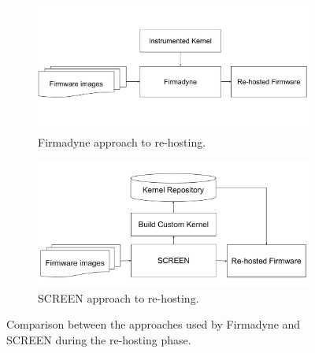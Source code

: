 \begin{figure}[h]
     \centering
     \begin{subfigure}[b]{0.45\textwidth}
         \centering
         \includegraphics[width=\textwidth]{figs/Firmadyne-Approach.pdf}
         \caption{Firmadyne approach to re-hosting.}
         \label{fig:firmadyne-approach}
     \end{subfigure}
     \hfill
     \begin{subfigure}[b]{0.45\textwidth}
         \centering
         \includegraphics[width=\textwidth]{figs/SCREEN-Approach.pdf}
         \caption{SCREEN approach to re-hosting.}
         \label{fig:screen-approach}
     \end{subfigure}
        \caption{Comparison between the approaches used by Firmadyne and SCREEN during the re-hosting phase.}
        \label{fig:firmadyne-screen-compare}
\end{figure}